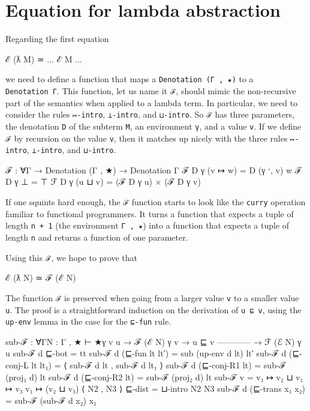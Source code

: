\hypertarget{equation-for-lambda-abstraction}{%
\section{Equation for lambda
abstraction}\label{equation-for-lambda-abstraction}}

Regarding the first equation

\begin{myDisplay}
ℰ (ƛ M) ≃ ... ℰ M ...
\end{myDisplay}

we need to define a function that maps a \texttt{Denotation\ (Γ\ ,\ ★)}
to a \texttt{Denotation\ Γ}. This function, let us name it \texttt{ℱ},
should mimic the non-recursive part of the semantics when applied to a
lambda term. In particular, we need to consider the rules
\texttt{↦-intro}, \texttt{⊥-intro}, and \texttt{⊔-intro}. So \texttt{ℱ}
has three parameters, the denotation \texttt{D} of the subterm
\texttt{M}, an environment \texttt{γ}, and a value \texttt{v}. If we
define \texttt{ℱ} by recursion on the value \texttt{v}, then it matches
up nicely with the three rules \texttt{↦-intro}, \texttt{⊥-intro}, and
\texttt{⊔-intro}.

\begin{fence}
\begin{code}
ℱ : ∀{Γ} → Denotation (Γ , ★) → Denotation Γ
ℱ D γ (v ↦ w) = D (γ `, v) w
ℱ D γ ⊥ = ⊤
ℱ D γ (u ⊔ v) = (ℱ D γ u) × (ℱ D γ v)
\end{code}
\end{fence}

If one squints hard enough, the \texttt{ℱ} function starts to look like
the \texttt{curry} operation familiar to functional programmers. It
turns a function that expects a tuple of length \texttt{n\ +\ 1} (the
environment \texttt{Γ\ ,\ ★}) into a function that expects a tuple of
length \texttt{n} and returns a function of one parameter.

Using this \texttt{ℱ}, we hope to prove that

\begin{myDisplay}
ℰ (ƛ N) ≃ ℱ (ℰ N)
\end{myDisplay}

The function \texttt{ℱ} is preserved when going from a larger value
\texttt{v} to a smaller value \texttt{u}. The proof is a straightforward
induction on the derivation of \texttt{u\ ⊑\ v}, using the
\texttt{up-env} lemma in the case for the \texttt{⊑-fun} rule.

\begin{fence}
\begin{code}
sub-ℱ : ∀{Γ}{N : Γ , ★ ⊢ ★}{γ v u}
  → ℱ (ℰ N) γ v
  → u ⊑ v
    ------------
  → ℱ (ℰ N) γ u
sub-ℱ d ⊑-bot = tt
sub-ℱ d (⊑-fun lt lt′) = sub (up-env d lt) lt′
sub-ℱ d (⊑-conj-L lt lt₁) = ⟨ sub-ℱ d lt , sub-ℱ d lt₁ ⟩
sub-ℱ d (⊑-conj-R1 lt) = sub-ℱ (proj₁ d) lt
sub-ℱ d (⊑-conj-R2 lt) = sub-ℱ (proj₂ d) lt
sub-ℱ {v = v₁ ↦ v₂ ⊔ v₁ ↦ v₃} {v₁ ↦ (v₂ ⊔ v₃)} ⟨ N2 , N3 ⟩ ⊑-dist =
   ⊔-intro N2 N3
sub-ℱ d (⊑-trans x₁ x₂) = sub-ℱ (sub-ℱ d x₂) x₁
\end{code}
\end{fence}

